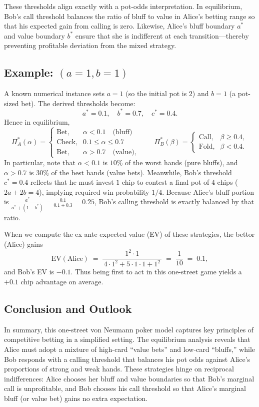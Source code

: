 \documentclass{article}
\begin{document}
These thresholds align exactly with a pot-odds interpretation.  In equilibrium, Bob's call threshold balances the ratio of bluff to value in Alice's betting range so that his expected gain from calling is zero.  Likewise, Alice's bluff boundary $a^*$ and value boundary $b^*$ ensure that she is indifferent at each transition—thereby preventing profitable deviation from the mixed strategy.

\subsection{Example: \texorpdfstring{$(a=1,b=1)$}{(a=1, b=1)}}

A known numerical instance sets $a=1$ (so the initial pot is $2$) and $b=1$ (a pot-sized bet).  The derived thresholds become:
\[
a^*=0.1,\quad b^*=0.7,\quad c^*=0.4.
\]
Hence in equilibrium,
\[
\Pi_A^*(\alpha) 
=\begin{cases}
\text{Bet}, & \alpha < 0.1 \quad\text{(bluff)}\\
\text{Check}, & 0.1 \le \alpha \le 0.7\\
\text{Bet}, & \alpha > 0.7 \quad\text{(value)},
\end{cases}
\qquad
\Pi_B^*(\beta)
=\begin{cases}
\text{Call}, & \beta \ge 0.4,\\
\text{Fold}, & \beta < 0.4.
\end{cases}
\]
In particular, note that \(\alpha<0.1\) is $10\%$ of the worst hands (pure bluffs), and \(\alpha>0.7\) is $30\%$ of the best hands (value bets).  Meanwhile, Bob's threshold $c^*=0.4$ reflects that he must invest $1$ chip to contest a final pot of $4$ chips ($2a + 2b = 4$), implying required win probability $1/4$.  Because Alice's bluff portion is $\tfrac{a^*}{a^*+(1-b^*)} = \tfrac{0.1}{0.1 +0.3} = 0.25$, Bob's calling threshold is exactly balanced by that ratio.  

When we compute the ex ante expected value (EV) of these strategies, the bettor (Alice) gains
\[
\text{EV}(\text{Alice}) \;=\; \frac{\,1^2\cdot1\,}{\,4\cdot1^2 + 5\cdot1\cdot1 + 1^2\,}
\;=\;
\frac{1}{10}
\;=\;0.1,
\]
and Bob's EV is $-0.1$.  Thus being first to act in this one-street game yields a $+0.1$ chip advantage on average.


\subsection{Conclusion and Outlook}

In summary, this one-street von Neumann poker model captures key principles of competitive betting in a simplified setting. The equilibrium analysis reveals that Alice must adopt a mixture of high-card ``value bets'' and low-card ``bluffs,'' while Bob responds with a calling threshold that balances his pot odds against Alice's proportions of strong and weak hands. These strategies hinge on reciprocal indifferences: Alice chooses her bluff and value boundaries so that Bob's marginal call is unprofitable, and Bob chooses his call threshold so that Alice's marginal bluff (or value bet) gains no extra expectation.
\end{document}

